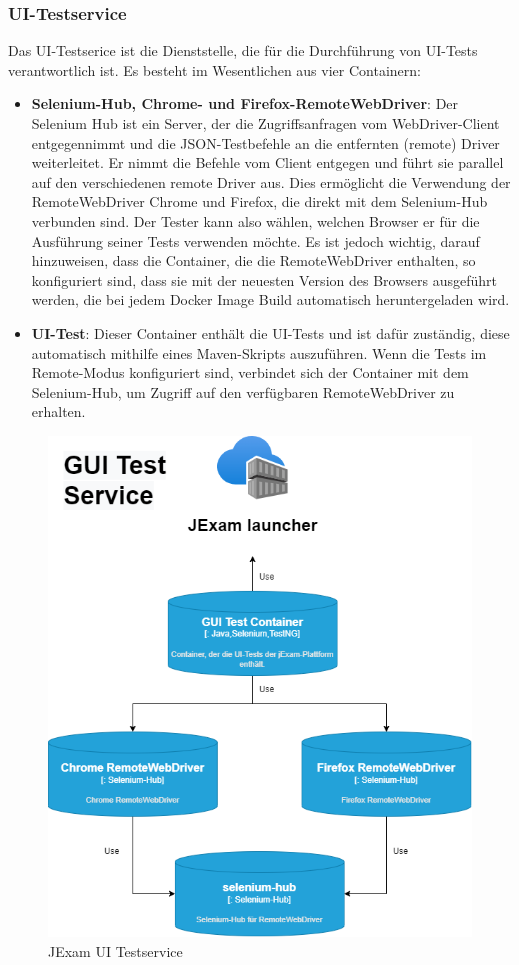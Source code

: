 \subsubsection{UI-Testservice}

Das UI-Testserice ist die Dienststelle, die für die Durchführung
von UI-Tests verantwortlich ist. Es besteht im Wesentlichen aus
vier Containern:

\begin{itemize}
    \setlength\itemsep{1em}

    \item[] \textbf{Selenium-Hub, Chrome- und Firefox-RemoteWebDriver}:
    Der Selenium Hub ist ein Server, der die Zugriffsanfragen vom 
    WebDriver-Client entgegennimmt und die JSON-Testbefehle an die 
    entfernten (remote) Driver weiterleitet. Er nimmt die Befehle vom 
    Client entgegen und führt sie parallel auf den verschiedenen 
    remote Driver aus. Dies ermöglicht die Verwendung der 
    RemoteWebDriver Chrome und Firefox, die direkt mit dem
    Selenium-Hub verbunden sind. Der Tester kann also wählen,
    welchen Browser er für die Ausführung seiner Tests verwenden
    möchte. Es ist jedoch wichtig, darauf hinzuweisen, dass die 
    Container, die die RemoteWebDriver enthalten, so konfiguriert 
    sind, dass sie mit der neuesten Version des Browsers ausgeführt 
    werden, die bei jedem Docker Image Build automatisch 
    heruntergeladen wird.

    \item[] \textbf{UI-Test}: Dieser Container enthält die UI-Tests
    und ist dafür zuständig, diese automatisch mithilfe eines
    Maven-Skripts auszuführen. Wenn die Tests im Remote-Modus
    konfiguriert sind, verbindet sich der Container mit dem
    Selenium-Hub, um Zugriff auf den verfügbaren RemoteWebDriver
    zu erhalten.
\end{itemize}

\begin{figure}[H]
    \centering
    \includegraphics[scale=0.6]{images/gui.drawio}
    \caption{JExam UI Testservice} \label{fig:ui}
\end{figure}